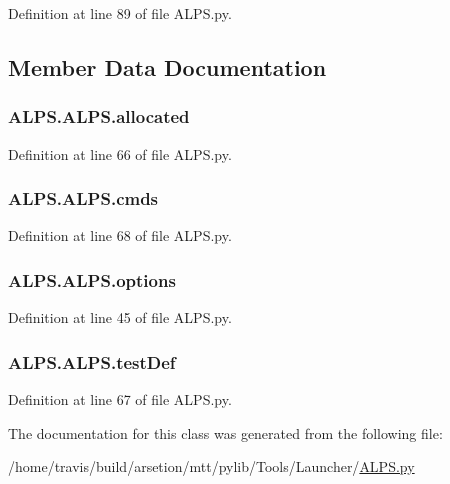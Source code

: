 Definition at line 89 of file A\-L\-P\-S.\-py.



\subsection{Member Data Documentation}
\hypertarget{classALPS_1_1ALPS_ac371dce53e8c120f7031259025562bdb}{
\subsubsection[{allocated}]{\setlength{\rightskip}{0pt plus 5cm}A\-L\-P\-S.\-A\-L\-P\-S.\-allocated}}\label{classALPS_1_1ALPS_ac371dce53e8c120f7031259025562bdb}


Definition at line 66 of file A\-L\-P\-S.\-py.

\hypertarget{classALPS_1_1ALPS_a64bae95ba692ef4df06f716692b50ee9}{
\subsubsection[{cmds}]{\setlength{\rightskip}{0pt plus 5cm}A\-L\-P\-S.\-A\-L\-P\-S.\-cmds}}\label{classALPS_1_1ALPS_a64bae95ba692ef4df06f716692b50ee9}


Definition at line 68 of file A\-L\-P\-S.\-py.

\hypertarget{classALPS_1_1ALPS_a24dfa9b508f507c4cb6148f10a081555}{
\subsubsection[{options}]{\setlength{\rightskip}{0pt plus 5cm}A\-L\-P\-S.\-A\-L\-P\-S.\-options}}\label{classALPS_1_1ALPS_a24dfa9b508f507c4cb6148f10a081555}


Definition at line 45 of file A\-L\-P\-S.\-py.

\hypertarget{classALPS_1_1ALPS_a839c4f84a46683221d51004c08345ff2}{
\subsubsection[{test\-Def}]{\setlength{\rightskip}{0pt plus 5cm}A\-L\-P\-S.\-A\-L\-P\-S.\-test\-Def}}\label{classALPS_1_1ALPS_a839c4f84a46683221d51004c08345ff2}


Definition at line 67 of file A\-L\-P\-S.\-py.



The documentation for this class was generated from the following file\-:\begin{DoxyCompactItemize}
\item 
/home/travis/build/arsetion/mtt/pylib/\-Tools/\-Launcher/\hyperlink{ALPS_8py}{A\-L\-P\-S.\-py}\end{DoxyCompactItemize}
